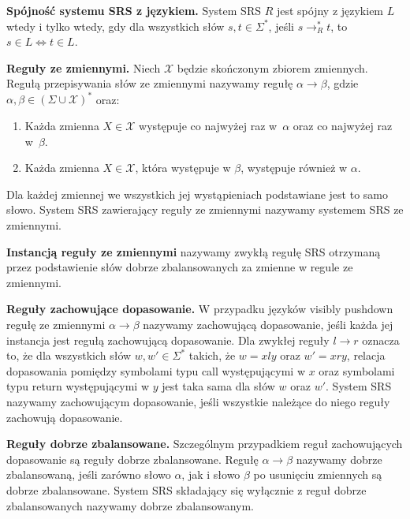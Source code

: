 \textbf{Spójność systemu SRS z językiem.} System SRS $R$ jest spójny z językiem $L$ wtedy i tylko wtedy, gdy dla wszystkich słów $s, t \in \Sigma^*$,
jeśli $s \to^*_R t$, to $s \in L \Leftrightarrow t \in L$.

\textbf{Reguły ze zmiennymi.} Niech $\mathcal{X}$ będzie skończonym zbiorem zmiennych. Regułą przepisywania słów ze zmiennymi
nazywamy regułę $\alpha \to \beta$, gdzie $\alpha, \beta \in (\Sigma \cup \mathcal{X})^*$ oraz:
\begin{enumerate}
    \item Każda zmienna $X \in \mathcal{X}$ występuje co najwyżej raz w~$\alpha$ oraz co najwyżej raz w~$\beta$.
    \item Każda zmienna $X \in \mathcal{X}$, która występuje w $\beta$, występuje również w $\alpha$.
\end{enumerate}
Dla każdej zmiennej we wszystkich jej wystąpieniach podstawiane jest to samo słowo. System SRS zawierający reguły ze zmiennymi
nazywamy systemem SRS ze zmiennymi.

\textbf{Instancją reguły ze zmiennymi} nazywamy zwykłą regułę SRS otrzymaną przez podstawienie słów dobrze zbalansowanych za zmienne
w regule ze zmiennymi.

\textbf{Reguły zachowujące dopasowanie.} W przypadku języków visibly pushdown regułę ze zmiennymi $\alpha \to \beta$ nazywamy
zachowującą dopasowanie, jeśli każda jej instancja jest regułą zachowującą dopasowanie.
Dla zwykłej reguły $l \to r$ oznacza to, że dla wszystkich słów $w,w' \in \Sigma^*$ takich, że $w=xly$ oraz $w'=xry$,
relacja dopasowania pomiędzy symbolami typu call występującymi w $x$ oraz symbolami typu return występującymi w $y$ jest
taka sama dla słów $w$ oraz $w'$. System SRS nazywamy zachowującym dopasowanie, jeśli wszystkie należące do niego reguły
zachowują dopasowanie.

\textbf{Reguły dobrze zbalansowane.} Szczególnym przypadkiem reguł zachowujących dopasowanie są reguły dobrze
zbalansowane. Regułę $\alpha \to \beta$ nazywamy dobrze zbalansowaną, jeśli zarówno słowo $\alpha$, jak i słowo $\beta$ po usunięciu
zmiennych są dobrze zbalansowane. System SRS składający się wyłącznie z reguł dobrze zbalansowanych nazywamy dobrze zbalansowanym.